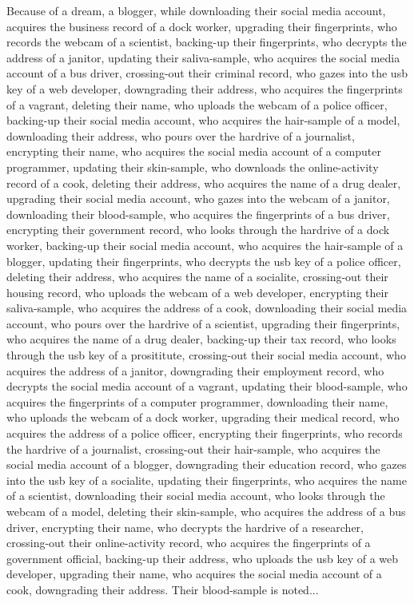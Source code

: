 \documentclass{report}
\begin{document}
Because of a dream, a blogger, while downloading their social media account, acquires the business record of a dock worker, upgrading their fingerprints, who records the webcam of a scientist, backing-up their fingerprints, who decrypts the address of a janitor, updating their saliva-sample, who acquires the social media account of a bus driver, crossing-out their criminal record, who gazes into the usb key of a web developer, downgrading their address, who acquires the fingerprints of a vagrant, deleting their name, who uploads the webcam of a police officer, backing-up their social media account, who acquires the hair-sample of a model, downloading their address, who pours over the hardrive of a journalist, encrypting their name, who acquires the social media account of a computer programmer, updating their skin-sample, who downloads the online-activity record of a cook, deleting their address, who acquires the name of a drug dealer, upgrading their social media account, who gazes into the webcam of a janitor, downloading their blood-sample, who acquires the fingerprints of a bus driver, encrypting their government record, who looks through the hardrive of a dock worker, backing-up their social media account, who acquires the hair-sample of a blogger, updating their fingerprints, who decrypts the usb key of a police officer, deleting their address, who acquires the name of a socialite, crossing-out their housing record, who uploads the webcam of a web developer, encrypting their saliva-sample, who acquires the address of a cook, downloading their social media account, who pours over the hardrive of a scientist, upgrading their fingerprints, who acquires the name of a drug dealer, backing-up their tax record, who looks through the usb key of a prosititute, crossing-out their social media account, who acquires the address of a janitor, downgrading their employment record, who decrypts the social media account of a vagrant, updating their blood-sample, who acquires the fingerprints of a computer programmer, downloading their name, who uploads the webcam of a dock worker, upgrading their medical record, who acquires the address of a police officer, encrypting their fingerprints, who records the hardrive of a journalist, crossing-out their hair-sample, who acquires the social media account of a blogger, downgrading their education record, who gazes into the usb key of a socialite, updating their fingerprints, who acquires the name of a scientist, downloading their social media account, who looks through the webcam of a model, deleting their skin-sample, who acquires the address of a bus driver, encrypting their name, who decrypts the hardrive of a researcher, crossing-out their online-activity record, who acquires the fingerprints of a government official, backing-up their address, who uploads the usb key of a web developer, upgrading their name, who acquires the social media account of a cook, downgrading their address. Their blood-sample is noted...
\end{document}

